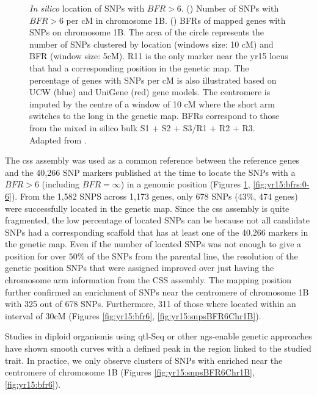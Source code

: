 \begin{figure}
\caption[\textit{In silico} location of SNPs with BFR\textgreater6]{\textit{In silico} location of SNPs with $BFR>6$. () Number of SNPs with $BFR>6$ per cM in chromosome 1B. () BFRs of mapped genes with SNPs on chromosome 1B. The area of the circle represents the number of SNPs clustered by location (windows size: 10 cM) and BFR (window size: 5cM). R11 is the only marker near the \acrshort{yr15} locus that had a corresponding position in the genetic map. The percentage of genes with SNPs per cM is also illustrated based on UCW (blue) and UniGene (red) gene models. The centromere is imputed by the centre of a window of 10 cM where the short arm switches to the long in the genetic map. BFRs correspond to those from the mixed in silico bulk S1 + S2 + S3/R1 + R2 + R3. Adapted from \citep{Ramirez-Gonzalez2015b}.} 
\label{fig:yr15:chr1}
\end{figure}

The \acrshort{css} assembly was used as a common reference between the reference genes and the 40,266 SNP markers published at the time \citep{Wang2014} to locate the SNPs with a $BFR>6$ (including $BFR=\infty$) in a genomic position (Figures \ref{fig:yr15:chr1}, \ref{fig:yr15:bfrs:0-6}).  
From the 1,582 SNPS across 1,173 genes,  only 678 SNPs ($43\%$, 474 genes) were successfully located in the genetic map. 
Since the \acrshort{css} assembly is quite fragmented, the low percentage of located SNPs can be because not all candidate SNPs had a corresponding scaffold that has at least one of the 40,266 markers in the genetic map. 
Even if the number of located SNPs was not enough to give a position for over $50\%$ of the SNPs from the parental line, the resolution of the genetic position SNPs that were assigned improved over just having the chromosome arm information from the CSS assembly. 
The mapping position further confirmed an enrichment of SNPs near the centromere of chromosome 1B with 325 out of 678 SNPs. 
Furthermore, 311 of those where located within an interval of 30cM (Figures \ref{fig:yr15:bfr6}, \ref{fig:yr15:snpsBFR6Chr1B}). 

Studies in diploid organismis using \acrshort{qtl}-Seq \citep{Takagi2013} or other \acrshort{ngs}-enable genetic approaches \citep{James2013} have shown smooth curves with a defined peak in the region linked to the studied trait. 
In practice, we only observe clusters of SNPs with  enriched  near the centromere of chromosome 1B (Figures \ref{fig:yr15:snpsBFR6Chr1B}, \ref{fig:yr15:bfr6}). 

